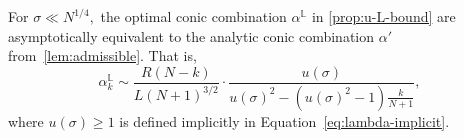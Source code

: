 \documentclass{article}
\begin{document}
\begin{lemma}\label{lem:asymptotics-moderate-sigma}
    For $\sigma\ll N^{1/4},$ the optimal conic combination $\alpha^{\mathbb L}$ in \cref{prop:u-L-bound} are asymptotically equivalent to the analytic conic combination $\alpha'$ from~\cref{lem:admissible}. That is,
    \begin{equation}\label{eq:alpha-opt-asymp-i}
    \alpha_k^{\mathbb L}\sim \frac{R(N-k)}{L(N+1)^{3/2}}\cdot\frac{u(\sigma)}{u(\sigma)^2-(u(\sigma)^2-1)\frac{k}{N+1}},
    \end{equation}
    where $u(\sigma)\ge1$ is defined implicitly in Equation~\eqref{eq:lambda-implicit}.
\end{lemma}
\end{document}
